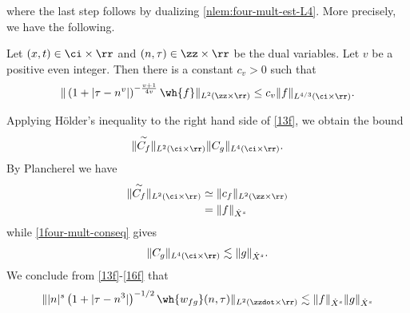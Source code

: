 %
where the last step follows by dualizing \cref{nlem:four-mult-est-L4}. More
precisely, we have the following.
\begin{corollary}
	\label{1cor:four-mult-est-L4}
	Let $(x, t) \in \ci \times \rr $ and $(n, \tau) \in \zz \times \rr$ be 
	the dual variables. Let $v$ be a positive even integer. Then there is a 
	constant $c_v > 0$ such that
%
%
\begin{equation}
	\label{1four-mult-est-L4*}
	\begin{split}
		\| \left( 1 + | \tau - n^v | 
		\right)^{-\frac{v+1}{4v}}
		\wh{f}\|_{L^2(\zz \times \rr)} \le c_v \|f \|_{L^{4/3}( \ci \times \rr)}.
	\end{split}
\end{equation}
%
%
\end{corollary}
%
Applying H\"{o}lder's inequality to the right hand side of
\eqref{13f}, we obtain the bound
%
\begin{equation}
	\label{14f}
	\begin{split}
		\|\overset{\sim}{C_f} \|_{L^2(\ci \times \rr)} \|C_g \|_{L^4\left( \ci 
		\times \rr 
		\right)}. 
	\end{split}
\end{equation}
%
By Plancherel we have
%
%
\begin{equation}
	\label{15f}
	\begin{split}
		\|\overset{\sim}{C_f} \|_{L^2(\ci \times \rr)}
		& \simeq \|c_f\|_{L^2(\zz \times \rr)}
		\\
		& = \|f \|_{\dot{X}^s}
	\end{split}
\end{equation}
%
while \eqref{1four-mult-conseq} gives
%
%
\begin{equation}
	\label{16f}
	\begin{split}
		\|C_g \|_{L^4(\ci \times \rr)} \lesssim \|g\|_{\dot{X}^s}.
	\end{split}
\end{equation}
%
%
We conclude from \eqref{13f}-\eqref{16f} that
%
%
\begin{equation*}
	\begin{split}
		\| |n|^s \left( 1 + | \tau - n^3 | \right)^{-1/2} \wh{w_{fg}}(n, \tau) 
		 \|_{L^2(\zzdot \times \rr)}
		 \lesssim \|f\|_{\dot{X}^s} \|g\|_{\dot{X}^s}
	\end{split}
\end{equation*}
%
%
